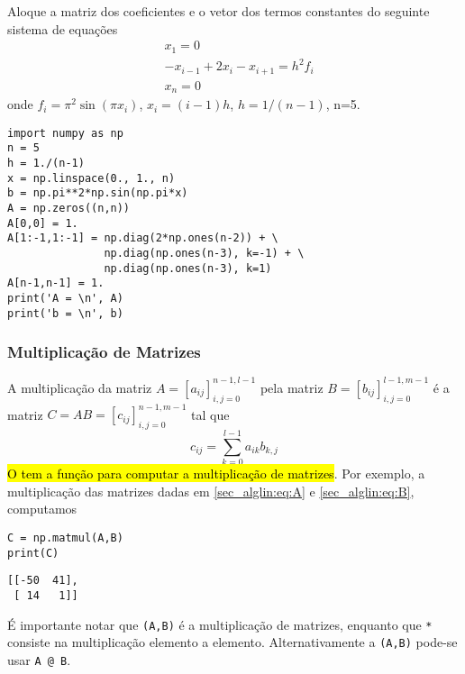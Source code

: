 \begin{exer}\label{sec_matricial:exer:laplaceprob}
  Aloque a matriz dos coeficientes e o vetor dos termos constantes do seguinte sistema de equações
  \begin{equation}
    \begin{aligned}
      & x_1 = 0 \\
      & -x_{i-1} + 2x_{i} - x_{i+1} = h^2f_i \\
      & x_n = 0
    \end{aligned}
  \end{equation}
  onde $f_i = \pi^2\sin(\pi x_i)$, $x_i = (i-1)h$, $h = 1/(n-1)$, n=5.
\end{exer}
\begin{resp}
  
\begin{lstlisting}
import numpy as np
n = 5
h = 1./(n-1)
x = np.linspace(0., 1., n)
b = np.pi**2*np.sin(np.pi*x)
A = np.zeros((n,n))
A[0,0] = 1.
A[1:-1,1:-1] = np.diag(2*np.ones(n-2)) + \
               np.diag(np.ones(n-3), k=-1) + \
               np.diag(np.ones(n-3), k=1)
A[n-1,n-1] = 1.
print('A = \n', A)
print('b = \n', b)
\end{lstlisting}

\end{resp}


\subsubsection{Multiplicação de Matrizes}

A multiplicação da matriz $A = [a_{ij}]_{i,j=0}^{n-1,l-1}$ pela matriz $B = [b_{ij}]_{i,j=0}^{l-1,m-1}$ é a matriz $C = AB = [c_{ij}]_{i,j=0}^{n-1,m-1}$ tal que
\begin{equation}
  c_{ij} = \sum_{k=0}^{l-1} a_{ik}b_{k,j}
\end{equation}
\hl{O {\PYTHONnumpy} tem a função {\PYTHONnumpyDOTmatmul} para computar a multiplicação de matrizes}. Por exemplo, a multiplicação das matrizes dadas em \eqref{sec_alglin:eq:A} e \eqref{sec_alglin:eq:B}, computamos

\begin{lstlisting}
C = np.matmul(A,B)
print(C)
\end{lstlisting}

\begin{verbatim}
[[-50  41],
 [ 14   1]]
\end{verbatim}

\begin{obs}[\hl{\texttt{matmul}, \texttt{*}, \texttt{@}}]
  É importante notar que {\PYTHONnumpyDOTmatmul}\texttt{(A,B)} é a multiplicação de matrizes, enquanto que \texttt{*} consiste na multiplicação elemento a elemento. Alternativamente a {\PYTHONnumpyDOTmatmul}\texttt{(A,B)} pode-se usar \texttt{A @ B}.
\end{obs}

